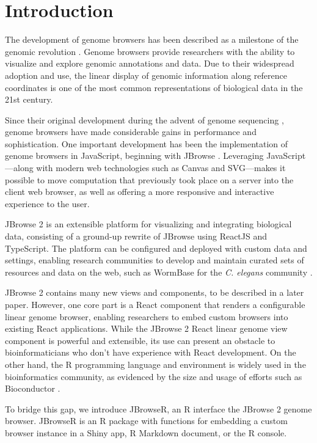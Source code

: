 \documentclass{bioinfo}
\begin{document}
\section{Introduction}

The development of genome browsers has been described as a milestone of
the genomic revolution \citep{packer2007clickable}. Genome browsers
provide researchers with the ability to visualize and explore genomic
annotations and data. Due to their widespread adoption and use, the
linear display of genomic information along reference coordinates is one
of the most common representations of biological data in the 21st
century.

Since their original development during the advent of genome sequencing
\citep{kent2002human, birney2004overview}, genome browsers have made
considerable gains in performance and sophistication. One important
development has been the implementation of genome browsers in
JavaScript, beginning with JBrowse \citep{buels2016jbrowse}. Leveraging
JavaScript---along with modern web technologies such as Canvas and
SVG---makes it possible to move computation that previously took place
on a server into the client web browser, as well as offering a more
responsive and interactive experience to the user.

JBrowse 2 is an extensible platform for visualizing and integrating
biological data, consisting of a ground-up rewrite of JBrowse using
ReactJS and TypeScript. The platform can be configured and deployed with
custom data and settings, enabling research communities to develop and
maintain curated sets of resources and data on the web, such as WormBase
for the \emph{C. elegans} community \citep{harris2010wormbase}.

JBrowse 2 contains many new views and components, to be described in a
later paper. However, one core part is a React component that renders a
configurable linear genome browser, enabling researchers to embed custom
browsers into existing React applications. While the JBrowse 2 React
linear genome view component is powerful and extensible, its use can
present an obstacle to bioinformaticians who don't have experience with
React development. On the other hand, the R programming language and
environment is widely used in the bioinformatics community, as evidenced
by the size and usage of efforts such as Bioconductor
\citep{huber2015orchestrating}.

To bridge this gap, we introduce JBrowseR, an R interface the JBrowse 2
genome browser. JBrowseR is an R package with functions for embedding a
custom browser instance in a Shiny app, R Markdown document, or the R
console.
\end{document}
